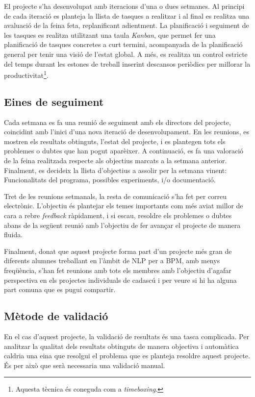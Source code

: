 El projecte s'ha desenvolupat amb iteracions d'una o dues setmanes. Al principi de cada iteració es planteja la llista de tasques a realitzar i al final es realitza una avaluació de la feina feta, replanificant adientment. La planificació i seguiment de les tasques es realitza utilitzant una taula \emph{Kanban}, que permet fer una planificació de tasques concretes a curt termini, acompanyada de la planificació general per tenir una visió de l'estat global. A més, es realitza un control estricte del temps durant les estones de treball inserint descansos periòdics per millorar la productivitat\footnote{Aquesta tècnica és coneguda com a \emph{timeboxing}.}.

\subsection{Eines de seguiment}

Cada setmana es fa una reunió de seguiment amb els directors del projecte, coincidint amb l'inici d'una nova iteració de desenvolupament. En les reunions, es mostren els resultats obtinguts, l'estat del projecte, i es plantegen tots els problemes o dubtes que han pogut aparèixer. A continuació, es fa una valoració de la feina realitzada respecte als objectius marcats a la setmana anterior. Finalment, es decideix la llista d'objectius a assolir per la setmana vinent: Funcionalitats del programa, possibles experiments, i/o documentació.

Tret de les reunions setmanals, la resta de comunicació s'ha fet per correu electrònic. L'objectiu és plantejar els temes importants com més aviat millor de cara a rebre \emph{feedback} ràpidament, i si escau, resoldre els problemes o dubtes abans de la següent reunió amb l'objectiu de fer avançar el projecte de manera fluida. 

Finalment, donat que aquest projecte forma part d'un projecte més gran de diferents alumnes treballant en l'àmbit de NLP per a BPM, amb menys freqüència, s'han fet reunions amb tots els membres amb l'objectiu d'agafar perspectiva en els projectes individuals de cadascú i per veure si hi ha alguna part comuna que es pugui compartir.

\subsection{Mètode de validació}

En el cas d'aquest projecte, la validació de resultats és una tasca complicada. Per analitzar la qualitat dels resultats obtinguts de manera objectiva i automàtica caldria una eina que resolgui el problema que es planteja resoldre aquest projecte. És per això que serà necessaria una validació manual.


